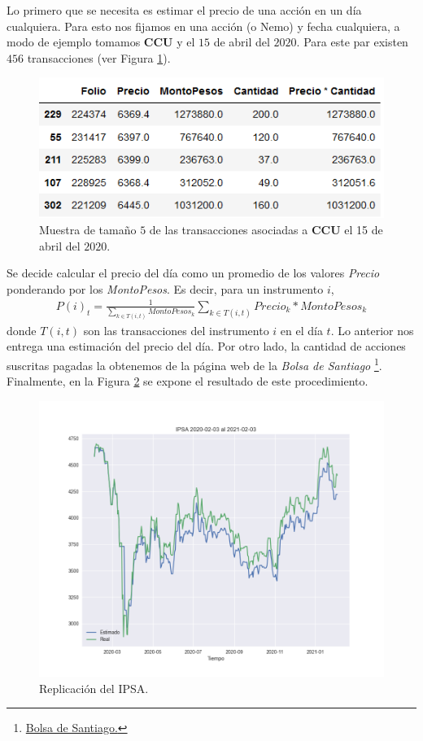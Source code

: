 \documentclass{article}
\begin{document}
   	Lo primero que se necesita es estimar el precio de una acción en un día cualquiera. Para esto nos fijamos en una acción (o Nemo) y fecha cualquiera, a modo de ejemplo tomamos \textbf{CCU} y el $15$ de abril del $2020$. Para este par existen $456$ transacciones (ver Figura \ref{fig:ccu_abril}).   
   	\begin{figure}[H]
   		\centering
   		\includegraphics[scale=.5]{imgs/ccu_abril.png}
   		\caption{Muestra de tamaño $5$ de las transacciones asociadas a \textbf{CCU} el 15 de abril del $2020$.}
   		\label{fig:ccu_abril}
   	\end{figure}
   	Se decide calcular el precio del día como un promedio de los valores \textit{Precio} ponderando por los \textit{MontoPesos}. Es decir, para un instrumento $i$,
   	\begin{align*}
   		P(i)_t = \frac{1}{\sum_{k\in T(i,t)} MontoPesos_k}\sum_{k\in T(i,t)} Precio_k * MontoPesos_k
   	\end{align*}
 	donde $T(i,t)$ son las transacciones del instrumento $i$ en el día $t$. Lo anterior nos entrega una estimación del precio del día. Por otro lado, la cantidad de acciones suscritas pagadas la obtenemos de la página web de la \textit{Bolsa de Santiago} \footnote{\href{https://www.bolsadesantiago.com/}{Bolsa de Santiago.}}. Finalmente, en la Figura \ref{fig:ipsa_replication} se expone el resultado de este procedimiento.
	\begin{figure}[H]
		\centering
		\includegraphics[scale=.5]{imgs/ipsa_replication.png}
		\caption{Replicación del IPSA.}
		\label{fig:ipsa_replication}
	\end{figure}
\end{document}
